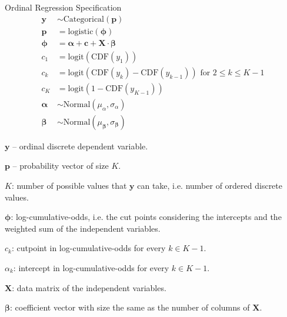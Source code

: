 \begin{frame}{Ordinal Regression Specification}
	\footnotesize
	$$
		\begin{aligned}
			\mathbf{y}          & \sim \text{Categorical}(\mathbf{p})                                                  \\
			\mathbf{p}          & = \text{logistic}(\boldsymbol{\phi})                                                 \\
			\boldsymbol{\phi}   & = \boldsymbol{\alpha} + \mathbf{c} + \mathbf{X} \cdot \boldsymbol{\beta}             \\
			c_1                 & = \text{logit}(\text{CDF}(y_1))                                                      \\
			c_k                 & = \text{logit}(\text{CDF}(y_k) - \text{CDF}(y_{k-1})) \text{ for } 2 \leq k \leq K-1 \\
			c_{K}               & = \text{logit}(1 - \text{CDF}(y_{K-1}))                                              \\
			\boldsymbol{\alpha} & \sim \text{Normal}(\mu_\alpha, \sigma_\alpha)                                        \\
			\boldsymbol{\beta}  & \sim \text{Normal}(\mu_{\boldsymbol{\beta}}, \sigma_{\boldsymbol{\beta}})
		\end{aligned}
	$$
	\begin{vfilleditems}
		\footnotesize{
			\item $\mathbf{y}$ -- ordinal discrete dependent variable.
			\item $\mathbf{p}$ -- probability vector of size $K$.
			\item $K$: number of possible values that $\mathbf{y}$ can take, i.e. number of ordered discrete values.
			\item $\boldsymbol{\phi}$: log-cumulative-odds, i.e. the cut points considering the intercepts and the weighted sum of the independent variables.
			\item $c_k$: cutpoint in log-cumulative-odds for every $k \in K-1$.
			\item $\alpha_k$: intercept in log-cumulative-odds for every $k \in K-1$.
			\item $\mathbf{X}$: data matrix of the independent variables.
			\item $\boldsymbol{\beta}$: coefficient vector with size the same as the number of columns of $\mathbf{X}$.
		}
	\end{vfilleditems}
\end{frame}
